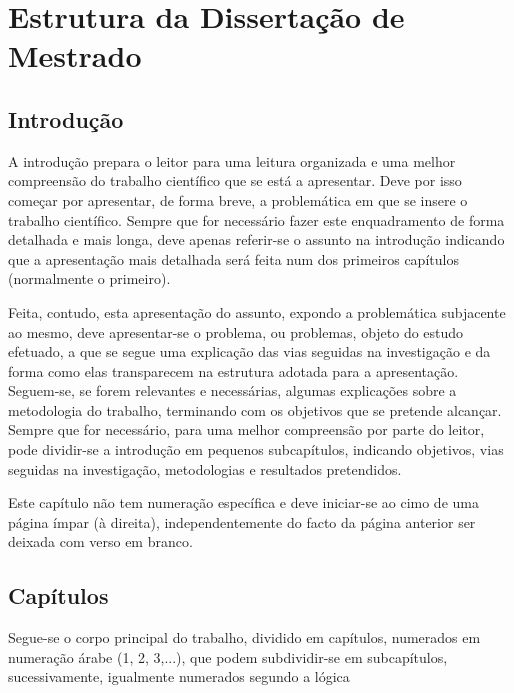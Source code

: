 % 
\chapter{Estrutura da Dissertação de Mestrado} %
\label{chap:Chapter1} %


%
\section{Introdução} 
\label{sec:chap1_introduction} %

A introdução prepara o leitor para uma leitura organizada e uma melhor compreensão do trabalho científico que se está a apresentar. Deve por isso começar por apresentar, de forma breve, a problemática em que se insere o trabalho científico.
Sempre que for necessário fazer este enquadramento de forma detalhada e mais longa, deve apenas referir-se o assunto na introdução indicando que a apresentação mais detalhada será feita num dos primeiros capítulos (normalmente o primeiro).

Feita, contudo, esta apresentação do assunto, expondo a problemática subjacente ao mesmo, deve apresentar-se o problema, ou problemas, objeto do estudo efetuado, a que se segue uma explicação das vias seguidas na investigação e da forma como elas transparecem na estrutura adotada para a apresentação. Seguem-se, se forem relevantes e necessárias, algumas explicações sobre a metodologia do trabalho, terminando com os objetivos que se pretende alcançar. Sempre que for necessário, para uma melhor compreensão por parte do leitor, pode dividir-se a introdução em pequenos subcapítulos, indicando objetivos, vias seguidas na investigação, metodologias e resultados pretendidos.

Este capítulo não tem numeração específica e deve iniciar-se ao cimo de uma página ímpar (à direita), independentemente do facto da página anterior ser deixada com verso em branco. 



\section{Capítulos}

Segue-se o corpo principal do trabalho, dividido em capítulos, numerados em numeração árabe (1, 2, 3,...), que podem subdividir-se em subcapítulos, sucessivamente, igualmente numerados segundo a lógica


